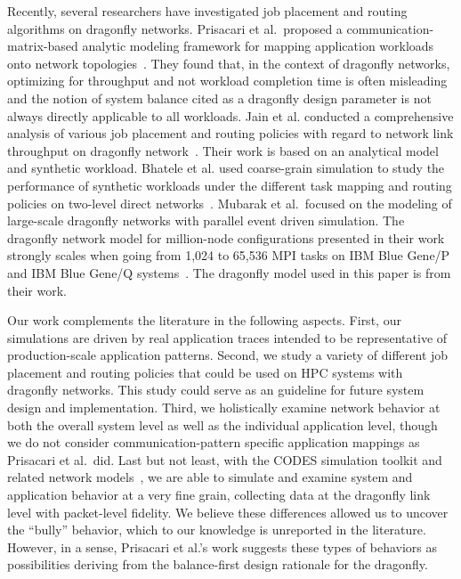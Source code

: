 Recently, several researchers have investigated job placement and routing algorithms on dragonfly networks. Prisacari et al.\ proposed a communication-matrix-based analytic modeling framework for mapping application workloads onto network topologies~\cite{hoefler-hpdc14}. They found that, in the context of dragonfly networks, optimizing for throughput and not workload completion time is often misleading and the notion of system balance cited as a dragonfly design parameter is not always directly applicable to all workloads.
Jain et al. conducted a comprehensive analysis of various job placement and routing policies with regard to network link throughput on dragonfly network~\cite{jain-sc14}. Their work is based on an analytical model and synthetic workload. Bhatele et al. used coarse-grain simulation to study the performance of synthetic workloads under the different task mapping and routing policies on two-level direct networks~\cite{bhatele-sc11}. Mubarak et al.\ focused on  the modeling of large-scale dragonfly networks with parallel event driven simulation. The dragonfly network model for million-node configurations presented in their work strongly scales when going from 1,024 to 65,536 MPI tasks on IBM Blue Gene/P and IBM Blue Gene/Q systems~\cite{codes-dragonfly}. The dragonfly model used in this paper is from their work. 

Our work complements the literature in the following aspects. First, our simulations are driven by real application traces intended to be representative of production-scale application patterns. 
Second, we study a variety of different job placement and routing policies that could be used on HPC systems with dragonfly networks. This study could serve as an guideline for future system design and implementation. 
Third, we holistically examine network behavior at both the overall system level as well as the individual application level, though we do not consider communication-pattern specific application mappings as Prisacari et al.\ did. 
Last but not least, with the CODES simulation toolkit and related network models~\cite{codes, codes-dragonfly}, we are able to simulate and examine system and application behavior at a very fine grain, collecting data at the dragonfly link level with packet-level fidelity. We believe these differences allowed us to uncover the ``bully'' behavior, which to our knowledge is unreported in the literature. However, in a sense, Prisacari et al.'s work suggests these types of behaviors as possibilities deriving from the balance-first design rationale for the dragonfly.


